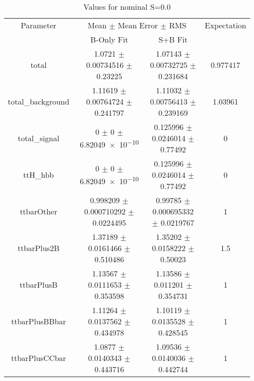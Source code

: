 \begin{table}
\centering
\caption{Values for nominal S=0.0}
\begin{tabular}{cccc}
\toprule
Parameter & \multicolumn{2}{c}{Mean $\pm$ Mean Error $\pm$ RMS} & Expectation\\
 & B-Only Fit & S+B Fit & \\
\midrule
total & \num{1.0721} $\pm$ \num{0.00734516} $\pm$ \num{0.23225} & \num{1.07143} $\pm$ \num{0.00732725} $\pm$ \num{0.231684} & \num{0.977417}\\
total\_background & \num{1.11619} $\pm$ \num{0.00764724} $\pm$ \num{0.241797} & \num{1.11032} $\pm$ \num{0.00756413} $\pm$ \num{0.239169} & \num{1.03961}\\
total\_signal & \num{0} $\pm$ \num{0} $\pm$ \num{6.82049e-10} & \num{0.125996} $\pm$ \num{0.0246014} $\pm$ \num{0.77492} & \num{0}\\
ttH\_hbb & \num{0} $\pm$ \num{0} $\pm$ \num{6.82049e-10} & \num{0.125996} $\pm$ \num{0.0246014} $\pm$ \num{0.77492} & \num{0}\\
ttbarOther & \num{0.998209} $\pm$ \num{0.000710292} $\pm$ \num{0.0224495} & \num{0.99785} $\pm$ \num{0.000695332} $\pm$ \num{0.0219767} & \num{1}\\
ttbarPlus2B & \num{1.37189} $\pm$ \num{0.0161466} $\pm$ \num{0.510486} & \num{1.35202} $\pm$ \num{0.0158222} $\pm$ \num{0.50023} & \num{1.5}\\
ttbarPlusB & \num{1.13567} $\pm$ \num{0.0111653} $\pm$ \num{0.353598} & \num{1.13586} $\pm$ \num{0.011201} $\pm$ \num{0.354731} & \num{1}\\
ttbarPlusBBbar & \num{1.11264} $\pm$ \num{0.0137562} $\pm$ \num{0.434978} & \num{1.10119} $\pm$ \num{0.0135528} $\pm$ \num{0.428545} & \num{1}\\
ttbarPlusCCbar & \num{1.0877} $\pm$ \num{0.0140343} $\pm$ \num{0.443716} & \num{1.09536} $\pm$ \num{0.0140036} $\pm$ \num{0.442744} & \num{1}\\
\bottomrule
\end{tabular}
\end{table}